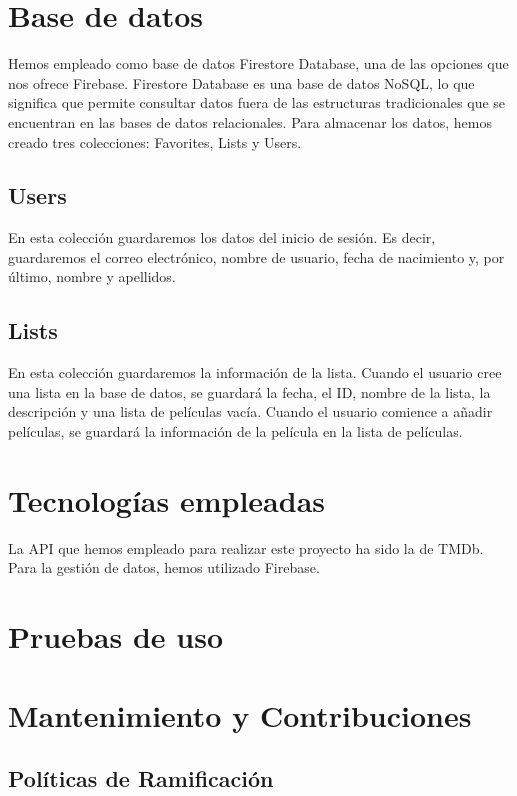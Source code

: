 \documentclass{article}
\begin{document}
\section{Base de datos}
Hemos empleado como base de datos Firestore Database, una de las opciones que nos ofrece Firebase. Firestore Database es una base de datos NoSQL, lo que significa que permite consultar datos fuera de las estructuras tradicionales que se encuentran en las bases de datos relacionales. Para almacenar los datos, hemos creado tres colecciones: Favorites, Lists y Users.

\subsection{Users}
En esta colección guardaremos los datos del inicio de sesión. Es decir, guardaremos el correo electrónico, nombre de usuario, fecha de nacimiento y, por último, nombre y apellidos.

\subsection{Lists}
En esta colección guardaremos la información de la lista. Cuando el usuario cree una lista en la base de datos, se guardará la fecha, el ID, nombre de la lista, la descripción y una lista de películas vacía. Cuando el usuario comience a añadir películas, se guardará la información de la película en la lista de películas.

\section{Tecnologías empleadas}
La API que hemos empleado para realizar este proyecto ha sido la de TMDb. Para la gestión de datos, hemos utilizado Firebase.

\section{Pruebas de uso}


\section{Mantenimiento y Contribuciones}

\subsection{Políticas de Ramificación}
\end{document}
